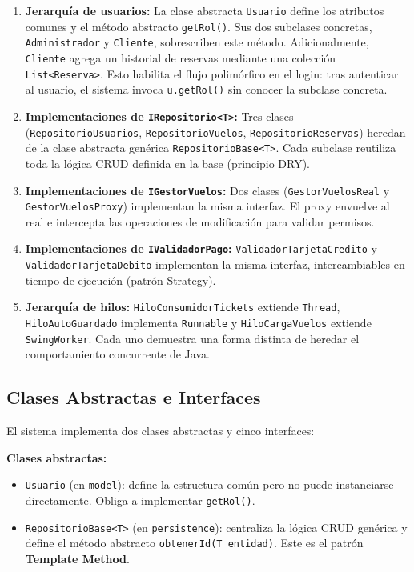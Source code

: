 \documentclass[12pt, letterpaper]{article}
\begin{document}
	\begin{enumerate}
		\item \textbf{Jerarquía de usuarios:} La clase abstracta \texttt{Usuario} define los atributos comunes y el método abstracto \texttt{getRol()}. Sus dos subclases concretas, \texttt{Administrador} y \texttt{Cliente}, sobrescriben este método. Adicionalmente, \texttt{Cliente} agrega un historial de reservas mediante una colección \texttt{List<Reserva>}. Esto habilita el flujo polimórfico en el login: tras autenticar al usuario, el sistema invoca \texttt{u.getRol()} sin conocer la subclase concreta.
		\item \textbf{Implementaciones de \texttt{IRepositorio<T>}:} Tres clases (\texttt{RepositorioUsuarios}, \texttt{RepositorioVuelos}, \texttt{RepositorioReservas}) heredan de la clase abstracta genérica \texttt{RepositorioBase<T>}. Cada subclase reutiliza toda la lógica CRUD definida en la base (principio DRY).
		\item \textbf{Implementaciones de \texttt{IGestorVuelos}:} Dos clases (\texttt{GestorVuelosReal} y \texttt{GestorVuelosProxy}) implementan la misma interfaz. El proxy envuelve al real e intercepta las operaciones de modificación para validar permisos.
		\item \textbf{Implementaciones de \texttt{IValidadorPago}:} \texttt{ValidadorTarjetaCredito} y \texttt{ValidadorTarjetaDebito} implementan la misma interfaz, intercambiables en tiempo de ejecución (patrón Strategy).
		\item \textbf{Jerarquía de hilos:} \texttt{HiloConsumidorTickets} extiende \texttt{Thread}, \texttt{HiloAutoGuardado} implementa \texttt{Runnable} y \texttt{HiloCargaVuelos} extiende \texttt{SwingWorker}. Cada uno demuestra una forma distinta de heredar el comportamiento concurrente de Java.
	\end{enumerate}
	
	\subsection{Clases Abstractas e Interfaces}
	El sistema implementa dos clases abstractas y cinco interfaces:
	
	\textbf{Clases abstractas:}
	\begin{itemize}
		\item \texttt{Usuario} (en \texttt{model}): define la estructura común pero no puede instanciarse directamente. Obliga a implementar \texttt{getRol()}.
		\item \texttt{RepositorioBase<T>} (en \texttt{persistence}): centraliza la lógica CRUD genérica y define el método abstracto \texttt{obtenerId(T entidad)}. Este es el patrón \textbf{Template Method}.
	\end{itemize}
	
\end{document}
